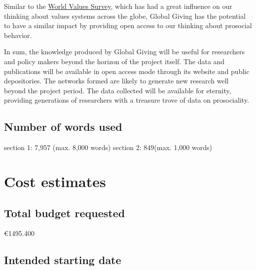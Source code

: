 \documentclass[twocolumn, serif, rga, numeric]{jote-article}
\begin{document}
Similar to the \href{http://www.worldvaluessurvey.org}{World Values Survey}, which has had a great influence on our thinking about values systems across the globe, Global Giving has the potential to have a similar impact by providing open access to our thinking about prosocial behavior.

In sum, the knowledge produced by Global Giving will be useful for researchers and policy makers beyond the horizon of the project itself.
The data and publications will be available in open access mode through its website and public depositories. The networks formed are likely to generate new research well beyond the project period. The data collected will be available for eternity, providing generations of researchers with a treasure trove of data on prosociality.

 {}\subsection*{Number of words used} 

section 1: 7,957 (max. 8,000 words) 
section 2: 849(max. 1,000 words) 
 {}\section*{Cost estimates} 


 {}\subsection*{Total budget requested} 

€1495.400 
 {}\subsection*{Intended starting date} 
\end{document}
